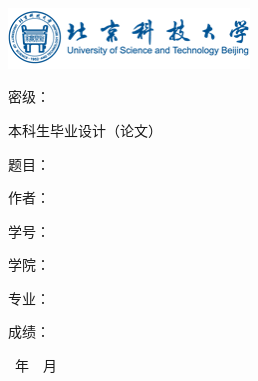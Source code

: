 \begin{titlepage}
  \noindent\includegraphics[width=0.48\textwidth]{imgs/logo.png}

  \begin{flushright}
    {\songti{}密级：\uline{}}
  \end{flushright}

  \vspace{3cm}

  {\noindent\heiti{}本科生毕业设计（论文）}

  \vspace{4.5cm}


  {\heiti 题\hspace{0.5em}目：}\uline{\makebox[7.5cm][c]{\ctitlefirst}}

  \vspace{0.4cm}

  {\heiti \hspace{3.5em}}\uline{\makebox[7.5cm][c]{\ctitlesecond}}

  \vspace{0.4cm}

  {\heiti 作\hspace{0.5em}者：}\uline{\makebox[7.5cm][c]{\name}}

  \vspace{0.4cm}

  {\heiti 学\hspace{0.5em}号：}\uline{\makebox[7.5cm][c]{\id}}

  \vspace{0.4cm}

  {\heiti 学\hspace{0.5em}院：}\uline{\makebox[7.5cm][c]{\collage}}

  \vspace{0.4cm}

  {\heiti 专\hspace{0.5em}业：}\uline{\makebox[7.5cm][c]{\class}}

  \vspace{0.4cm}

  {\heiti 成\hspace{0.5em}绩：}\uline{\makebox[7.5cm][c]{}}

  \vspace{0.7cm}

  \begin{center}
    {\songti{}\year\ 年\ \month\ 月}
  \end{center}

\end{titlepage}